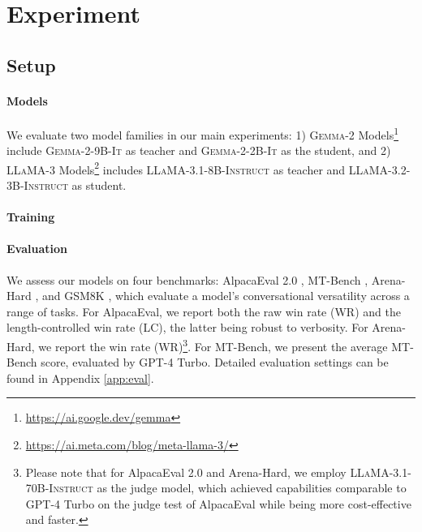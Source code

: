 

\section{Experiment}

\subsection{Setup}

\paragraph{Models}
We evaluate two model families in our main experiments: 1) \textsc{Gemma-2} Models\footnote{\url{https://ai.google.dev/gemma}} \citep{gemmateam2024improvingopen} include \textsc{Gemma-2-9B-It} as teacher and \textsc{Gemma-2-2B-It} as the student, and 2) \textsc{LLaMA-3} Models\footnote{\url{https://ai.meta.com/blog/meta-llama-3/}} \citep{dubey2024llama3herdmodels} includes \textsc{LLaMA-3.1-8B-Instruct} as teacher and \textsc{LLaMA-3.2-3B-Instruct} as student.

\paragraph{Training}

\paragraph{Evaluation}
We assess our models on four benchmarks: AlpacaEval 2.0 \citep{alpaca-eval}, MT-Bench \citep{zheng-2023-judging}, Arena-Hard \citep{arenahard-2024}, and GSM8K \citep{cobbe-2021-math}, which evaluate a model's conversational versatility across a range of tasks. For AlpacaEval, we report both the raw win rate (WR) and the length-controlled win rate (LC), the latter being robust to verbosity. For Arena-Hard, we report the win rate (WR)\footnote{Please note that for AlpacaEval 2.0 and Arena-Hard, we employ \textsc{LLaMA-3.1-70B-Instruct} as the judge model, which achieved capabilities comparable to GPT-4 Turbo on the judge test of AlpacaEval while being more cost-effective and faster.}. For MT-Bench, we present the average MT-Bench score, evaluated by GPT-4 Turbo. Detailed evaluation settings can be found in Appendix \ref{app:eval}.

